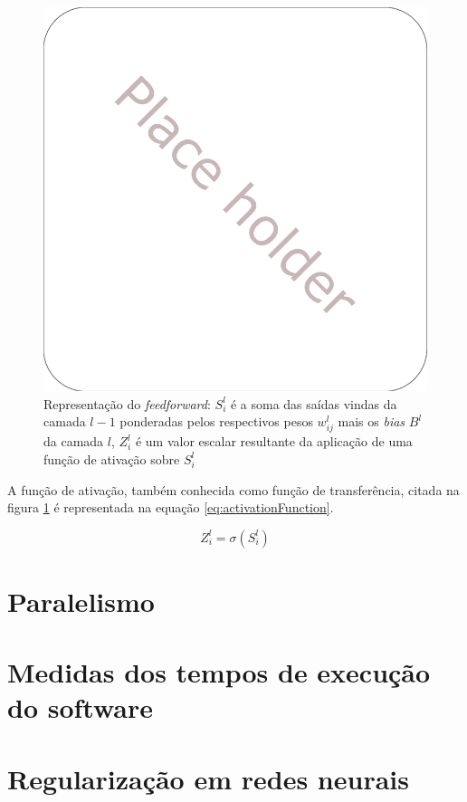 \begin{apendicesenv}
	\begin{figure}[H]
		\centering
		\caption[Representação do \textit{feedforward}]{Representação do \textit{feedforward}: $S^l_i$ é a soma das saídas vindas da camada $l-1$ ponderadas pelos respectivos pesos $ w^l_{ij}$ mais os \textit{bias} $B^l$ da camada $l$, $Z^l_i$ é um valor escalar resultante da aplicação de uma função de ativação sobre $S^l_i$}
		\label{fig:layersFeedforward}
		\includegraphics[width=0.5\linewidth]{images/placeholder}
	\end{figure}

	\par A função de ativação, também conhecida como função de transferência, citada na figura \ref{fig:layersFeedforward} é representada na equação \ref{eq:activationFunction}.
	
	\begin{equation}\label{eq:activationFunction}
		Z^l_i = \sigma(S^l_i)
	\end{equation}
	
	\chapter{Paralelismo}
		\par 
		
		\chapter{Medidas dos tempos de execução do software}



	\chapter{Regularização em redes neurais}
	\label{chap:regularizacao}


\end{apendicesenv}
